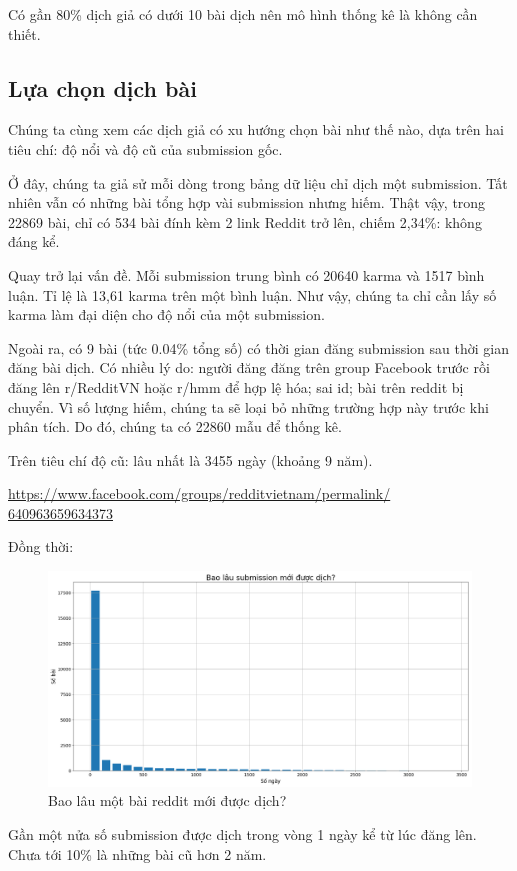 \documentclass[10pt,a4paper]{article}
\begin{document}
Có gần 80\% dịch giả có dưới 10 bài dịch nên mô hình thống kê là không cần thiết.

\subsection{Lựa chọn dịch bài}
Chúng ta cùng xem các dịch giả có xu hướng chọn bài như thế nào, dựa trên hai tiêu chí: độ nổi và độ cũ của submission gốc.

Ở đây, chúng ta giả sử mỗi dòng trong bảng dữ liệu chỉ dịch một submission. Tất nhiên vẫn có những bài tổng hợp vài submission nhưng hiếm. Thật vậy, trong 22869 bài, chỉ có 534 bài đính kèm 2 link Reddit trở lên, chiếm 2,34\%: không đáng kể.

Quay trở lại vấn đề. Mỗi submission trung bình có 20640 karma và 1517 bình luận. Tỉ lệ là 13,61 karma trên một bình luận. Như vậy, chúng ta chỉ cần lấy số karma làm đại diện cho độ nổi của một submission.

Ngoài ra, có 9 bài (tức 0.04\% tổng số) có thời gian đăng submission sau thời gian đăng bài dịch. Có nhiều lý do: người đăng đăng trên group Facebook trước rồi đăng lên r/RedditVN hoặc r/hmm để hợp lệ hóa; sai id; bài trên reddit bị chuyển. Vì số lượng hiếm, chúng ta sẽ loại bỏ những trường hợp này trước khi phân tích. Do đó, chúng ta có 22860 mẫu để thống kê.

Trên tiêu chí độ cũ: lâu nhất là 3455 ngày (khoảng 9 năm).

\href{https://www.facebook.com/groups/redditvietnam/permalink/640963659634373}{https://www.facebook.com/groups/redditvietnam/permalink/\\640963659634373}

Đồng thời:
\begin{figure}[!h]
    \centering
    \includegraphics[width=\textwidth]{img/DelaysDistribution.png}
    \caption{Bao lâu một bài reddit mới được dịch?}
    \label{fig:delaysdistribution}
\end{figure}
Gần một nửa số submission được dịch trong vòng 1 ngày kể từ lúc đăng lên. Chưa tới 10\% là những bài cũ hơn 2 năm.
\end{document}

